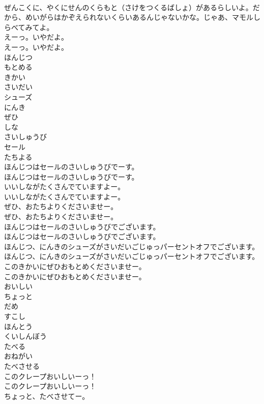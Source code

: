 \documentclass[8pt]{extreport}
\begin{document}
\begin{CJK}{UTF8}{min}
\\	ぜんこくに、やくにせんのくらもと（さけをつくるばしょ）があるらしいよ。だから、めいがらはかぞえられないくらいあるんじゃないかな。じゃあ、マモルしらべてみてよ。
\\	えーっ。いやだよ。
\\	えーっ。いやだよ。
\\	ほんじつ
\\	もとめる
\\	きかい
\\	さいだい
\\	シューズ
\\	にんき
\\	ぜひ
\\	しな
\\	さいしゅうび
\\	セール
\\	たちよる
\\	ほんじつはセールのさいしゅうびでーす。
\\	ほんじつはセールのさいしゅうびでーす。
\\	いいしながたくさんでていますよー。
\\	いいしながたくさんでていますよー。
\\	ぜひ、おたちよりくださいませー。
\\	ぜひ、おたちよりくださいませー。
\\	ほんじつはセールのさいしゅうびでございます。
\\	ほんじつはセールのさいしゅうびでございます。
\\	ほんじつ、にんきのシューズがさいだいごじゅっパーセントオフでございます。
\\	ほんじつ、にんきのシューズがさいだいごじゅっパーセントオフでございます。
\\	このきかいにぜひおもとめくださいませー。
\\	このきかいにぜひおもとめくださいませー。
\\	おいしい
\\	ちょっと
\\	だめ
\\	すこし
\\	ほんとう
\\	くいしんぼう
\\	たべる
\\	おねがい
\\	たべさせる
\\	このクレープおいしいーっ！
\\	このクレープおいしいーっ！
\\	ちょっと、たべさせてー。

\end{CJK}
\end{document}
